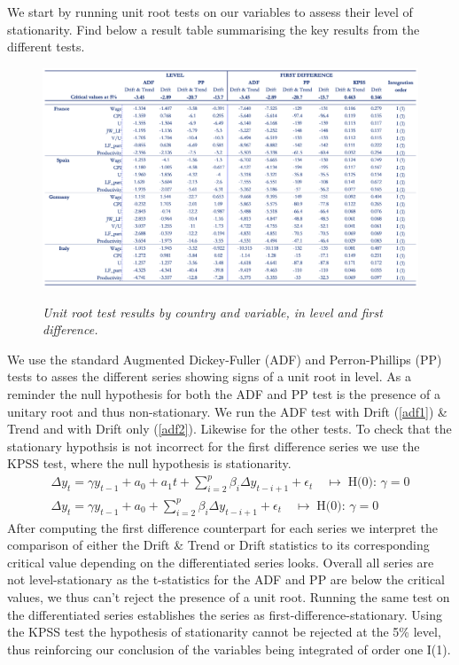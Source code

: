 We start by running unit root tests on our variables to assess their level of stationarity.
Find below a result table summarising the key results from the different tests.

\begin{figure}[H]
    \centering
    \caption{\textit{Unit root test results by country and variable, in level and first difference.}}
    \includegraphics[width=1\textwidth]{Core/2.Labour/img/unit_root.png}
    \label{figure:Labour_ur}
\end{figure}
\vspace{-1cm}
\newpage
We use the standard Augmented Dickey-Fuller (ADF) and Perron-Phillips (PP) tests to asses the different series showing signs of a unit root in level. 
As a reminder the null hypothesis for both the ADF and PP test is the presence of a unitary root and thus non-stationary. 
We run the ADF test with Drift (\ref{adf1}) \& Trend and with Drift only (\ref{adf2}). Likewise for the other tests. To check that the stationary hypothsis is not incorrect for the first difference series we use the KPSS test, where the null hypothesis is stationarity.
\begin{align}
    \Delta y_{t} = \gamma y_{t-1} + a_{0} + a_{1}t + \sum_{i=2}^{p}\beta_{i} \Delta y_{t-i+1} + \epsilon_{t} \quad \longmapsto \; \textrm{H(0): } \gamma = 0 \label{adf1} \\
    \Delta y_{t} = \gamma y_{t-1} + a_{0} + \sum_{i=2}^{p}\beta_{i} \Delta y_{t-i+1} + \epsilon_{t} \quad \longmapsto \; \textrm{H(0): } \gamma = 0 \label{adf2}
\end{align}
\quad After computing the first difference counterpart for each series we interpret the comparison of either the Drift \& Trend or Drift statistics to its corresponding critical value depending on the differentiated series looks. 
Overall all series are not level-stationary as the  t-statistics for the ADF and PP are below the critical values, we thus can’t reject the presence of a unit root. 
Running the same test on the differentiated series establishes the series as first-difference-stationary. Using the KPSS test the hypothesis of stationarity cannot be rejected at the 5\% level, thus reinforcing our conclusion of the variables being integrated of order one I(1).


